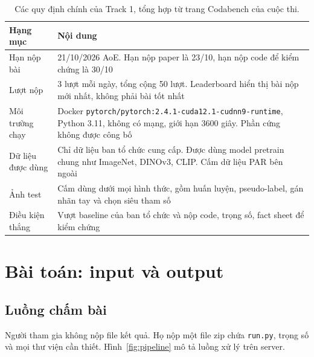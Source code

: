 \documentclass[11pt,a4paper]{article}
\begin{document}
\begin{table}[H]
\centering\small
\begin{tabularx}{\linewidth}{@{}lX@{}}
\toprule
Hạng mục & Nội dung \\
\midrule
Hạn nộp bài & 21/10/2026 AoE. Hạn nộp paper là 23/10, hạn nộp code để kiểm chứng là 30/10 \\
Lượt nộp & 3 lượt mỗi ngày, tổng cộng 50 lượt. Leaderboard hiển thị bài nộp mới nhất, không phải bài tốt nhất \\
Môi trường chạy & Docker \texttt{pytorch/pytorch:2.4.1-cuda12.1-cudnn9-runtime}, Python 3.11, không có mạng, giới hạn 3600 giây. Phần cứng không được công bố \\
Dữ liệu được dùng & Chỉ dữ liệu ban tổ chức cung cấp. Được dùng model pretrain chung như ImageNet, DINOv3, CLIP. Cấm dữ liệu PAR bên ngoài \\
Ảnh test & Cấm dùng dưới mọi hình thức, gồm huấn luyện, pseudo-label, gán nhãn tay và chọn siêu tham số \\
Điều kiện thắng & Vượt baseline của ban tổ chức và nộp code, trọng số, fact sheet để kiểm chứng \\
\bottomrule
\end{tabularx}
\caption{Các quy định chính của Track 1, tổng hợp từ trang Codabench của cuộc thi.}
\end{table}

\section{Bài toán: input và output}

\subsection{Luồng chấm bài}

Người tham gia không nộp file kết quả. Họ nộp một file zip chứa \texttt{run.py}, trọng số và mọi thư viện cần thiết. Hình~\ref{fig:pipeline} mô tả luồng xử lý trên server.
\end{document}
